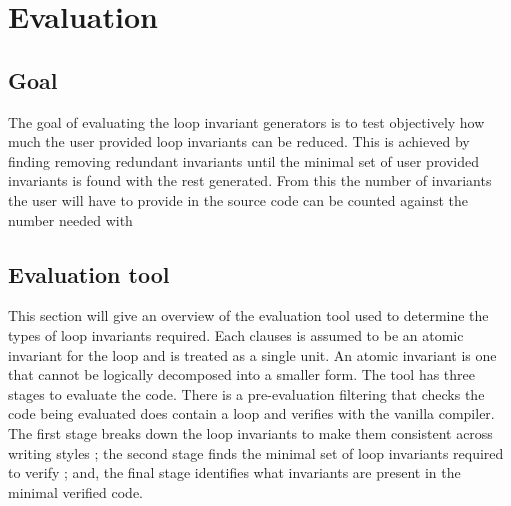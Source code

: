 \chapter{Evaluation}\label{C:eval}

\section{Goal}

The goal of evaluating the loop invariant generators is to test objectively how much the
user provided loop invariants can be reduced.
This is achieved by finding removing redundant invariants until the minimal
set of user provided invariants is found with the rest generated.
From this the number of invariants the user will have to provide
in the source code can be counted against the number needed with 


\section{Evaluation tool}\label{S:eval-tool}

This section will give an overview of the evaluation tool used to
determine the types of loop invariants required.
Each  clauses is assumed to be an atomic invariant for the loop and is treated as a single unit.
An atomic invariant is one that cannot be logically decomposed into a smaller form. 
The tool has three stages to evaluate the code.
There is a pre-evaluation filtering that checks the code being evaluated does
contain a loop and verifies with the vanilla compiler.
The first stage breaks down the loop invariants to make them consistent
across writing styles ;
the second stage finds the minimal set of loop invariants required to verify ;
and, the final stage identifies what invariants are present in the minimal
verified code.



